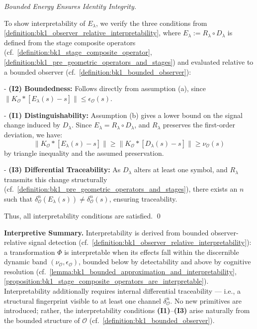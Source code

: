 \begin{proof}[Bounded Energy Ensures Identity Integrity]
\label{proof:bk1_energy_bound_identity}
\leavevmode

To show interpretability of \(E_\lambda\), we verify the three conditions from \ref{definition:bk1_observer_relative_interpretability}, where \(E_\lambda := R_\lambda \circ D_\lambda\) is defined from the stage composite operators (cf.~\ref{definition:bk1_stage_composite_operator}, \ref{definition:bk1_pre_geometric_operators_and_stages}) and evaluated relative to a bounded observer (cf.~\ref{definition:bk1_bounded_observer}):

- \textbf{(I2) Boundedness:}  
  Follows directly from assumption (a), since \(\|K_{\mathcal{O}} \ast [E_\lambda(s) - s]\| \le \epsilon_{\mathcal{O}}(s)\).

- \textbf{(I1) Distinguishability:}  
  Assumption (b) gives a lower bound on the signal change induced by \(D_\lambda\).  
  Since \(E_\lambda = R_\lambda \circ D_\lambda\), and \(R_\lambda\) preserves the first-order deviation,  
  we have:  
  \[
  \|K_{\mathcal{O}} \ast [E_\lambda(s) - s]\| \ge \|K_{\mathcal{O}} \ast [D_\lambda(s) - s]\| \ge \nu_{\mathcal{O}}(s)
  \]
  by triangle inequality and the assumed preservation.

- \textbf{(I3) Differential Traceability:}  
  As \(D_\lambda\) alters at least one symbol, and \(R_\lambda\) transmits this change structurally  
  (cf.~\ref{definition:bk1_pre_geometric_operators_and_stages}),  
  there exists an \(n\) such that \(\delta^n_{\mathcal{O}}(E_\lambda(s)) \ne \delta^n_{\mathcal{O}}(s)\),  
  ensuring traceability.

Thus, all interpretability conditions are satisfied. \qed
\end{proof}

\vspace{1em}
\noindent\textbf{Interpretive Summary.}  
Interpretability is derived from bounded observer-relative signal detection  
(cf.~\ref{definition:bk1_observer_relative_interpretability}):  
a transformation \(\Phi\) is interpretable when its effects fall within the  
discernible dynamic band \((\nu_{\mathcal{O}}, \epsilon_{\mathcal{O}})\),  
bounded below by detectability and above by cognitive resolution  
(cf.~\ref{lemma:bk1_bounded_approximation_and_interpretability},  
\ref{proposition:bk1_stage_composite_operators_are_interpretable}).  
Interpretability additionally requires internal differential traceability —  
i.e., a structural fingerprint visible to at least one channel \(\delta^n_{\mathcal{O}}\).  
No new primitives are introduced; rather, the interpretability conditions  
\textbf{(I1)}–\textbf{(I3)} arise naturally from the bounded structure of \(\mathcal{O}\)  
(cf.~\ref{definition:bk1_bounded_observer}).

